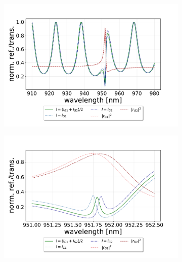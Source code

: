 \begin{figure}[h!]
    \centering
    \begin{subfigure}[b]{0.49\textwidth}
        \includegraphics[width=\textwidth]{figures/results/M3:M5/M3:M5_sim_spectra_long.pdf}
        \caption{}
        \label{}
    \end{subfigure}
    \begin{subfigure}[b]{0.49\textwidth}
        \includegraphics[width=\textwidth]{figures/results/M3:M5/M3:M5_sim_spectra_short.pdf}
        \caption{}
        \label{}
    \end{subfigure}
    \caption{}
    \label{}
\end{figure}

